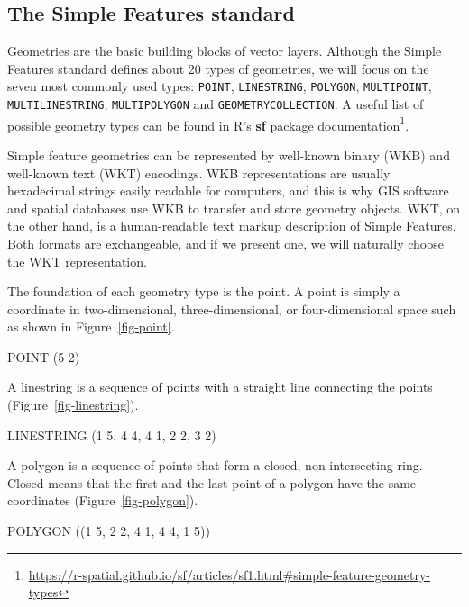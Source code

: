 \documentclass[
  letterpaper,
]{krantz}
\newenvironment{Shaded}{\begin{snugshade}}{\end{snugshade}}
\newcommand{\NormalTok}[1]{\textcolor[rgb]{0.00,0.23,0.31}{#1}}
\begin{document}
\subsection{The Simple Features standard}\label{sec-simple-features}

Geometries are the basic building blocks of vector layers. Although the
Simple Features standard defines about 20 types of geometries, we will
focus on the seven most commonly used types: \texttt{POINT},
\texttt{LINESTRING}, \texttt{POLYGON}, \texttt{MULTIPOINT},
\texttt{MULTILINESTRING}, \texttt{MULTIPOLYGON} and
\texttt{GEOMETRYCOLLECTION}. A useful list of possible geometry types
can be found in R's \textbf{sf} package documentation\footnote{\url{https://r-spatial.github.io/sf/articles/sf1.html\#simple-feature-geometry-types}}.

Simple feature geometries can be represented by well-known binary (WKB)
and well-known text (WKT) encodings. WKB representations are usually
hexadecimal strings easily readable for computers, and this is why GIS
software and spatial databases use WKB to transfer and store geometry
objects. WKT, on the other hand, is a human-readable text markup
description of Simple Features. Both formats are exchangeable, and if we
present one, we will naturally choose the WKT representation.

The foundation of each geometry type is the point. A point is simply a
coordinate in two-dimensional, three-dimensional, or four-dimensional
space such as shown in Figure~\ref{fig-point}.

\begin{Shaded}
\begin{Highlighting}[]
\NormalTok{POINT (5 2)}
\end{Highlighting}
\end{Shaded}

A linestring is a sequence of points with a straight line connecting the
points (Figure~\ref{fig-linestring}).

\begin{Shaded}
\begin{Highlighting}[]
\NormalTok{LINESTRING (1 5, 4 4, 4 1, 2 2, 3 2)}
\end{Highlighting}
\end{Shaded}

A polygon is a sequence of points that form a closed, non-intersecting
ring. Closed means that the first and the last point of a polygon have
the same coordinates (Figure~\ref{fig-polygon}).

\begin{Shaded}
\begin{Highlighting}[]
\NormalTok{POLYGON ((1 5, 2 2, 4 1, 4 4, 1 5))}
\end{Highlighting}
\end{Shaded}
\end{document}

